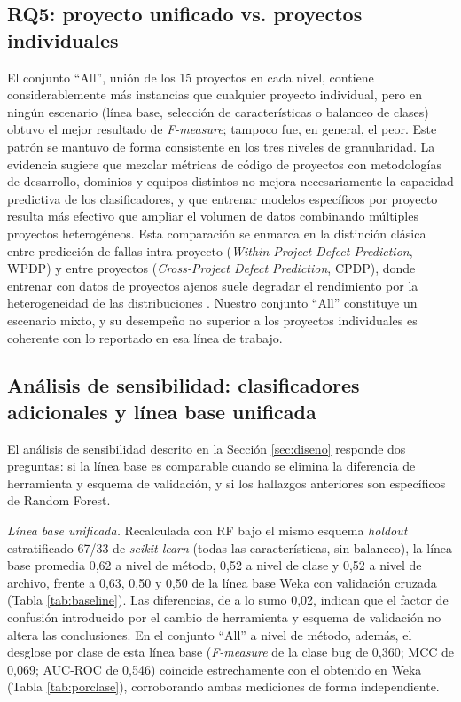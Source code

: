\documentclass[conference,a4paper]{IEEEtran}
\begin{document}
\subsection{RQ5: proyecto unificado vs. proyectos individuales}

El conjunto ``All'', unión de los 15 proyectos en cada nivel, contiene considerablemente más instancias que cualquier proyecto individual, pero en ningún escenario (línea base, selección de características o balanceo de clases) obtuvo el mejor resultado de \textit{F-measure}; tampoco fue, en general, el peor. Este patrón se mantuvo de forma consistente en los tres niveles de granularidad. La evidencia sugiere que mezclar métricas de código de proyectos con metodologías de desarrollo, dominios y equipos distintos no mejora necesariamente la capacidad predictiva de los clasificadores, y que entrenar modelos específicos por proyecto resulta más efectivo que ampliar el volumen de datos combinando múltiples proyectos heterogéneos. Esta comparación se enmarca en la distinción clásica entre predicción de fallas intra-proyecto (\textit{Within-Project Defect Prediction}, WPDP) y entre proyectos (\textit{Cross-Project Defect Prediction}, CPDP), donde entrenar con datos de proyectos ajenos suele degradar el rendimiento por la heterogeneidad de las distribuciones \cite{cheng2022,sharma2023far}. Nuestro conjunto ``All'' constituye un escenario mixto, y su desempeño no superior a los proyectos individuales es coherente con lo reportado en esa línea de trabajo.

\subsection{Análisis de sensibilidad: clasificadores adicionales y línea base unificada}
\label{sec:sensibilidad}

El análisis de sensibilidad descrito en la Sección \ref{sec:diseno} responde dos preguntas: si la línea base es comparable cuando se elimina la diferencia de herramienta y esquema de validación, y si los hallazgos anteriores son específicos de Random Forest.

\textit{Línea base unificada.} Recalculada con RF bajo el mismo esquema \textit{holdout} estratificado 67/33 de \textit{scikit-learn} (todas las características, sin balanceo), la línea base promedia 0,62 a nivel de método, 0,52 a nivel de clase y 0,52 a nivel de archivo, frente a 0,63, 0,50 y 0,50 de la línea base Weka con validación cruzada (Tabla \ref{tab:baseline}). Las diferencias, de a lo sumo 0,02, indican que el factor de confusión introducido por el cambio de herramienta y esquema de validación no altera las conclusiones. En el conjunto ``All'' a nivel de método, además, el desglose por clase de esta línea base (\textit{F-measure} de la clase bug de 0,360; MCC de 0,069; AUC-ROC de 0,546) coincide estrechamente con el obtenido en Weka (Tabla \ref{tab:porclase}), corroborando ambas mediciones de forma independiente.
\end{document}
